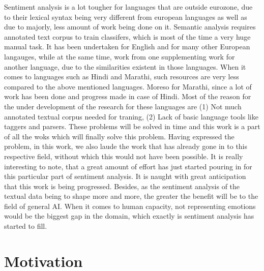 \documentclass[12pt]{book}
\begin{document}
Sentiment analysis is a lot tougher for languages that are outside eurozone,
due to their lexical syntax being very different from european languages as
well as due to majorly, less amount of work being done on it. Semantic analysis
requires annotated text corpus to train classifers, which is most of the time a
very huge manual task. It has been undertaken for English and for many other
European langauges, while at the same time, work from one supplementing work
for another language, due to the similarities existent in those languages. When
it comes to languages such as Hindi and Marathi, such resources are very less
compared to the above mentioned languages. Moreso for Marathi, since a lot of
work has been done and progress made in case of Hindi. Most of the reason for
the under development of the research for these languages are (1) Not much
annotated textual corpus needed for traning, (2) Lack of basic language tools
like taggers and parsers. These problems will be solved in time and this work
is a part of all the woks which will finally solve this problem. 
Having expressed the problem, in this work, we also laude the work that has
already gone in to this respective field, without which this would not have
been possible. It is really interesting to note, that a great amount of effort
has just started pouring in for this particular part of sentiment analysis. It
is naught with great anticipation that this work is being progressed. Besides,
as the sentiment analysis of the textual data being to shape more and more, the
greater the benefit will be to the field of general AI. When it comes to human
capacity, not representing emotions would be the biggest gap in the domain,
which exactly is sentiment analysis has started to fill. \\


\chapter{Motivation}
\end{document}
